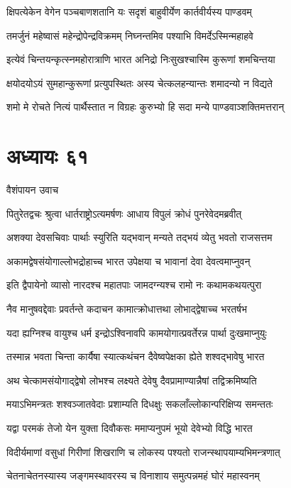\twolineshloka
{क्षिपत्येकेन वेगेन पञ्चबाणशतानि यः}
{सदृशं बाहुवीर्येण कार्तवीर्यस्य पाण्डवम्}


\twolineshloka
{तमर्जुनं महेष्वासं महेन्द्रोपेन्द्रविक्रमम्}
{निघ्नन्तमिव पश्याभि विमर्देऽस्मिन्महाहवे}


\twolineshloka
{इत्येवं चिन्तयन्कृत्स्नमहोरात्राणि भारत}
{अनिद्रो निःसुखश्चास्मि कुरूणां शमचिन्तया}


\twolineshloka
{क्षयोदयोऽयं सुमहान्कुरूणां प्रत्युपस्थितः}
{अस्य चेत्कलहन्यान्तः शमादन्यो न विद्यते}


\twolineshloka
{शमो मे रोचते नित्यं पार्थैस्तात न विग्रहः}
{कुरुभ्यो हि सदा मन्ये पाण्डवाञ्शक्तिमत्तरान्}


\chapter{अध्यायः ६१}
\twolineshloka
{वैशंपायन उवाच}
{}


\twolineshloka
{पितुरेतद्वचः श्रुत्वा धार्तराष्ट्रोऽत्यमर्षणः}
{आधाय विपुलं क्रोधं पुनरेवेदमब्रवीत्}


\twolineshloka
{अशक्या देवसचिवाः पार्थाः स्युरिति यद्भवान्}
{मन्यते तद्भयं व्येतु भवतो राजसत्तम}


\twolineshloka
{अकामद्वेषसंयोगाल्लोभद्रोहाच्च भारत}
{उपेक्षया च भावानां देवा देवत्वमाप्नुवन्}


\twolineshloka
{इति द्वैपायेनो व्यासो नारदश्च महातपाः}
{जामदग्न्यश्च रामो नः कथामकथयत्पुरा}


\twolineshloka
{नैव मानुषवद्देवाः प्रवर्तन्ते कदाचन}
{कामात्क्रोधात्तथा लोभाद्द्वेषाच्च भरतर्षभ}


\twolineshloka
{यदा ह्यग्निश्च वायुश्च धर्म इन्द्रोऽश्विनावपि}
{कामयोगात्प्रवर्तेरन्न पार्था दुःखमाप्नुयुः}


\twolineshloka
{तस्मान्न भवता चिन्ता कार्यैषा स्यात्कथंचन}
{दैवेष्वपेक्षका ह्येते शश्वद्भावेषु भारत}


\twolineshloka
{अथ चेत्कामसंयोगाद्द्वेषो लोभश्च लक्ष्यते}
{देवेषु दैवप्रामाण्यान्नैषां तद्विक्रमिष्यति}


\twolineshloka
{मयाऽभिमन्त्रतः शश्वञ्जातवेदाः प्रशाम्यति}
{दिधक्षुः सकलाँल्लोकान्परिक्षिप्य समन्ततः}


\twolineshloka
{यद्वा परमकं तेजो येन युक्ता दिवौकसः}
{ममाप्यनुपमं भूयो देवेभ्यो विद्धि भारत}


\twolineshloka
{विदीर्यमाणां वसुधां गिरीणां शिखराणि च}
{लोकस्य पश्यतो राजन्स्थापयाम्यभिमन्त्रणात्}


\twolineshloka
{चेतनाचेतनस्यास्य जङ्गमस्थावरस्य च}
{विनाशाय समुत्पन्नमहं घोरं महास्वनम्}


